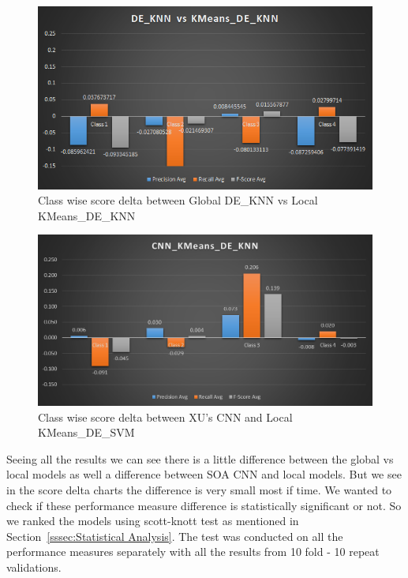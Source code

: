 \documentclass[sigconf]{acmart}
\theoremstyle{break}
\begin{document}
    \begin{figure}
        \centering
        \includegraphics[width=\linewidth]{fig/KNN_vs_KMeans.png}
        \caption{Class wise score delta between Global DE\_KNN vs Local KMeans\_DE\_KNN}
        \label{fig:Global_vs_Local_DE_KNN}
    \end{figure}
    
    \begin{figure}
        \centering
        \includegraphics[width=\linewidth]{fig/cnn_vs_Kmeans_Knn.png}
        \caption{Class wise score delta between XU's CNN and Local KMeans\_DE\_SVM}
        \label{fig:CNN_vs_KMeans_DE_KNN}
    \end{figure}
    
    Seeing all the results we can see there is a little difference between the global vs local models as well a difference between SOA CNN and local models. But we see in the score delta charts the difference is very small most if time. We wanted to check if these performance measure difference is statistically significant or not. So we ranked the models using scott-knott test as mentioned in Section~\ref{sssec:Statistical Analysis}. The test was conducted on all the performance measures separately with all the results from 10 fold - 10 repeat validations.
    
\end{document}
